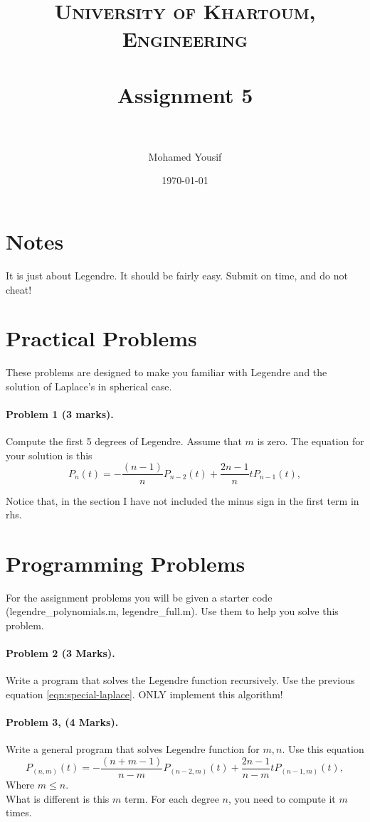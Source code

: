 \documentclass[paper=a4, fontsize=11pt]{scrartcl} %
\title{	
\normalfont \normalsize 
\textsc{University of Khartoum, Engineering} \\ [25pt] %
\horrule{0.5pt} \\[0.4cm] %
\huge Assignment 5 \\ %
\horrule{2pt} \\[0.5cm] %
}
\author{Mohamed Yousif} %
\date{\normalsize\today} %
\numberwithin{equation}{section} %
\numberwithin{figure}{section} %
\numberwithin{table}{section} %
\begin{document}
\maketitle %


\section*{Notes}
It is just about Legendre. It should be fairly easy. Submit on time, and do not cheat!



\section{Practical Problems}
These problems are designed to make you familiar with Legendre and the solution of Laplace's in spherical case.
\paragraph{Problem 1 (3 marks).}Compute the first 5 degrees of Legendre. Assume that $m$ is zero. The equation for your solution is this
\begin{equation}
\label{eqn:special-laplace}
P_{n}(t) = -\frac{(n - 1)}{n}P_{n-2}(t) + \frac{2n - 1}{n}t P_{n - 1} (t),
\end{equation}

Notice that, in the section I have not included the minus sign in the first term in rhs.

\section{Programming Problems}
For the assignment problems you will be given a starter code (legendre\_polynomials.m, legendre\_full.m). Use them to help you solve this problem.
\paragraph{Problem 2 (3 Marks).}Write a program that solves the Legendre function recursively. Use the previous equation \eqref{eqn:special-laplace}. ONLY implement this algorithm!

\paragraph{Problem 3, (4 Marks).}Write a general program that solves Legendre function for $m,n$. Use this equation
\begin{equation}
P_{(n,m)}(t) = -\frac{(n + m - 1)}{n-m}P_{(n-2,m)}(t) + \frac{2n - 1}{n-m}t P_{(n - 1,m)} (t),
\end{equation}
Where $m \le n$.\\
What is different is this $m$ term. For each degree $n$, you need to compute it $m$ times.
\end{document}
